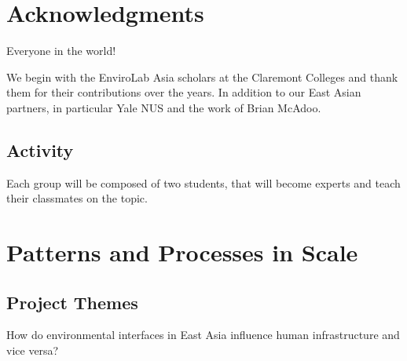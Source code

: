 \section{Acknowledgments}

Everyone in the world!

We begin with the EnviroLab Asia scholars at the Claremont Colleges and thank them for their contributions over the years. In addition to our East Asian partners, in particular Yale NUS and the work of Brian McAdoo. 




\subsection{Activity}

Each group will be composed of two students, that will become experts and teach their classmates on the topic. 


\section{Patterns and Processes in Scale}

\subsection{Project Themes}

How do environmental interfaces in East Asia influence human infrastructure and vice versa?

